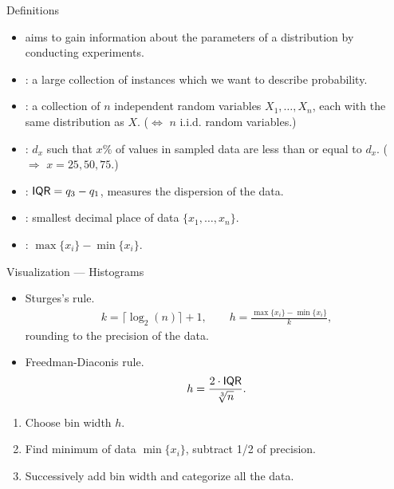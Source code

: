 \begin{frame}{Definitions}

\justifying
\begin{itemize}
	\justifying
	\item {} aims to gain information about the parameters of a distribution by conducting experiments.
	\item {}: a large collection of instances which we want to describe probability.
	\item {}: a collection of $n$ independent random variables $X_1, \ldots, X_n$, each with the same distribution as $X$. ($\Leftrightarrow$ $n$ i.i.d. random variables.)
	\item {}: $d_x$ such that $x\%$ of values in sampled data are less than or equal to $d_x$. ( $\Rightarrow$ $x = 25, 50, 75$.)
	\item {}: $\mathsf{IQR} = q_3 - q_1$, measures the dispersion of the data.
	\item {}: smallest decimal place of data $\{x_1, \ldots, x_n\}$.
	\item {}: $\max\{x_i\} - \min\{x_i\}$.
\end{itemize}


\end{frame}


\begin{frame}{Visualization --- Histograms}

\begin{itemize}
	\item Sturges's rule.
	\begin{align*}
	k = \lceil \log_2(n)\rceil + 1, \qquad h = \frac{\max\{x_i\} - \min\{x_i\}}{k},
	\end{align*}
	rounding  to the precision of the data.
	\item Freedman-Diaconis rule.
	\begin{align*}
	h = \frac{2\cdot \mathsf{IQR}}{\sqrt[3]{n}}.
	\end{align*}
\end{itemize}
\begin{enumerate}
	\item Choose bin width $h$.
	\item Find minimum of data $\min\{x_i\}$, subtract 1/2 of precision.
	\item Successively add bin width and categorize all the data.
\end{enumerate}

\end{frame}


